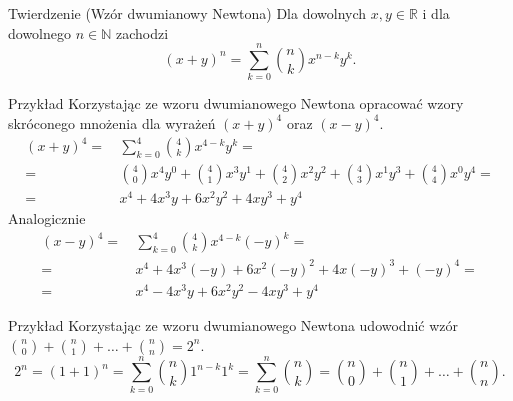 \documentclass[a4paper,10pt]{beamer}
\begin{document}
\begin{frame}
	
	\begin{block}{Twierdzenie (Wzór dwumianowy Newtona)}
		Dla dowolnych $x,y\in\mathbb{R}$ i dla dowolnego $n\in\mathbb{N}$ zachodzi
		$$(x+y)^n=\sum\limits_{k=0}^n{n\choose k}x^{n-k}y^k.$$	
	\end{block}

\end{frame}



\begin{frame}
	\begin{exampleblock}{Przykład}
	Korzystając ze wzoru dwumianowego Newtona opracować wzory skróconego mnożenia dla wyrażeń $(x+y)^4$ oraz $(x-y)^4$.
	\begin{align*}
		(x+y)^4=&\,\sum\limits_{k=0}^4{4\choose k}x^{4-k}y^k=\\
		=&\,{4\choose 0}x^4y^0+{4\choose 1}x^3y^1+{4\choose 2}x^2y^2+{4\choose 3}x^1y^3+{4\choose 4}x^0y^4=\\
		=&\,x^4+4x^3y+6x^2y^2+4xy^3+y^4
	\end{align*}
Analogicznie
	\begin{align*}
	(x-y)^4=&\,\sum\limits_{k=0}^4{4\choose k}x^{4-k}(-y)^k=\\
	=&\,x^4+4x^3(-y)+6x^2(-y)^2+4x(-y)^3+(-y)^4=\\
	=&\,x^4-4x^3y+6x^2y^2-4xy^3+y^4
\end{align*}
		
	\end{exampleblock}
	
\end{frame}



\begin{frame}
	
	\begin{exampleblock}{Przykład}		
		Korzystając ze wzoru dwumianowego Newtona udowodnić wzór $\displaystyle {n\choose 0}+{n\choose1}+\ldots+{n\choose n}=2^n$.
		$$2^n=(1+1)^n=\sum\limits_{k=0}^n{n\choose k}1^{n-k}1^k=\sum\limits_{k=0}^n{n\choose k}={n\choose 0}+{n\choose1}+\ldots+{n\choose n}.$$
	\end{exampleblock}
	
\end{frame}



	
	
\end{document}

